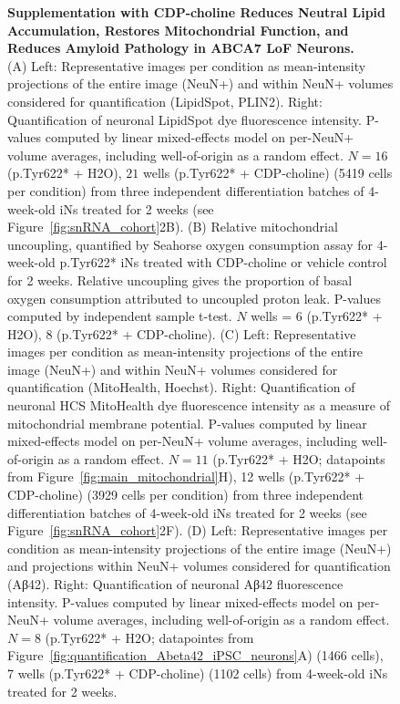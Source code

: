 \begin{figure}[ht]
    \caption{
        \textbf{Supplementation with CDP-choline Reduces Neutral Lipid Accumulation, Restores Mitochondrial Function, and Reduces Amyloid Pathology in ABCA7 LoF Neurons.}\\[1ex]
        (A) Left: Representative images per condition as mean-intensity projections of the entire image (NeuN+) and within NeuN+ volumes considered for quantification (LipidSpot, PLIN2). Right: Quantification of neuronal LipidSpot dye fluorescence intensity. P-values computed by linear mixed-effects model on per-NeuN+ volume averages, including well-of-origin as a random effect. $N = 16$ (p.Tyr622* + H2O), $21$ wells (p.Tyr622* + CDP-choline) (5419 cells per condition) from three independent differentiation batches of 4-week-old iNs treated for 2 weeks (see Figure~\ref{fig:snRNA_cohort}2B). 
        (B) Relative mitochondrial uncoupling, quantified by Seahorse oxygen consumption assay for 4-week-old p.Tyr622* iNs treated with CDP-choline or vehicle control for 2 weeks. Relative uncoupling gives the proportion of basal oxygen consumption attributed to uncoupled proton leak. P-values computed by independent sample t-test. $N$ wells = 6 (p.Tyr622* + H2O), 8 (p.Tyr622* + CDP-choline). 
        (C) Left: Representative images per condition as mean-intensity projections of the entire image (NeuN+) and within NeuN+ volumes considered for quantification (MitoHealth, Hoechst). Right: Quantification of neuronal HCS MitoHealth dye fluorescence intensity as a measure of mitochondrial membrane potential. P-values computed by linear mixed-effects model on per-NeuN+ volume averages, including well-of-origin as a random effect. $N = 11$ (p.Tyr622* + H2O; datapoints from Figure~\ref{fig:main_mitochondrial}H), 12 wells (p.Tyr622* + CDP-choline) (3929 cells per condition) from three independent differentiation batches of 4-week-old iNs treated for 2 weeks (see Figure~\ref{fig:snRNA_cohort}2F). 
        (D) Left: Representative images per condition as mean-intensity projections of the entire image (NeuN+) and projections within NeuN+ volumes considered for quantification (Aβ42). Right: Quantification of neuronal Aβ42 fluorescence intensity. P-values computed by linear mixed-effects model on per-NeuN+ volume averages, including well-of-origin as a random effect. $N = 8$ (p.Tyr622* + H2O; datapointes from Figure~\ref{fig:quantification_Abeta42_iPSC_neurons}A) (1466 cells), 7 wells (p.Tyr622* + CDP-choline) (1102 cells) from 4-week-old iNs treated for 2 weeks. 
}
\end{figure}
